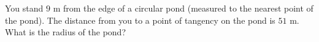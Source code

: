 You stand $9$ m from the edge of a circular pond (measured to the nearest point of the pond). The distance from you to a point of tangency on the pond is $51$ m. What is the radius of the pond?
